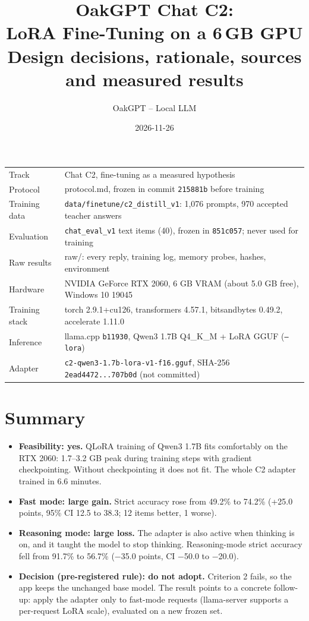 \documentclass[11pt,a4paper]{article}
\title{\textbf{OakGPT Chat C2:\\LoRA Fine-Tuning on a 6\,GB GPU}\\[4pt]
  \large Design decisions, rationale, sources and measured results}
\author{OakGPT -- Local LLM}
\date{2026-11-26}
\newcommand{\code}[1]{\texttt{#1}}
\begin{document}
\maketitle



\begin{table}[H]\centering\small
\begin{tabularx}{\textwidth}{@{}lY@{}}
\toprule
Track & Chat C2, fine-tuning as a measured hypothesis \\
Protocol & protocol.md, frozen in commit \code{215881b} before training \\
Training data & \code{data/finetune/c2\_distill\_v1}: 1,076 prompts, 970 accepted teacher answers \\
Evaluation & \code{chat\_eval\_v1} text items (40), frozen in \code{851c057}; never used for training \\
Raw results & raw/: every reply, training log, memory probes, hashes, environment \\
Hardware & NVIDIA GeForce RTX 2060, 6 GB VRAM (about 5.0 GB free), Windows 10 19045 \\
Training stack & torch 2.9.1+cu126, transformers 4.57.1, bitsandbytes 0.49.2, accelerate 1.11.0 \\
Inference & llama.cpp \code{b11930}, Qwen3 1.7B Q4\_K\_M + LoRA GGUF (\code{--lora}) \\
Adapter & \code{c2-qwen3-1.7b-lora-v1-f16.gguf}, SHA-256 \code{2ead4472...707b0d} (not committed) \\
\bottomrule\end{tabularx}\end{table}

\section{Summary}

\begin{itemize}
\item \textbf{Feasibility: yes.} QLoRA training of Qwen3 1.7B fits comfortably on the RTX 2060: 1.7--3.2 GB peak during training steps with gradient checkpointing. Without checkpointing it does not fit. The whole C2 adapter trained in 6.6 minutes.
\item \textbf{Fast mode: large gain.} Strict accuracy rose from 49.2\% to 74.2\% (+25.0 points, 95\% CI 12.5 to 38.3; 12 items better, 1 worse).
\item \textbf{Reasoning mode: large loss.} The adapter is also active when thinking is on, and it taught the model to stop thinking. Reasoning-mode strict accuracy fell from 91.7\% to 56.7\% ($-$35.0 points, CI $-$50.0 to $-$20.0).
\item \textbf{Decision (pre-registered rule): do not adopt.} Criterion 2 fails, so the app keeps the unchanged base model. The result points to a concrete follow-up: apply the adapter only to fast-mode requests (llama-server supports a per-request LoRA scale), evaluated on a new frozen set.
\end{itemize}
\end{document}
